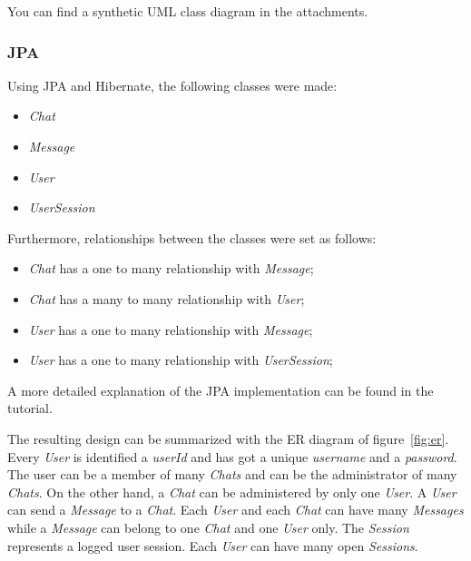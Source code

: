 \documentclass[10pt]{article}
\begin{document}
You can find a synthetic UML class diagram in the attachments.

\subsubsection{JPA}

Using JPA and Hibernate, the following classes were made:
\begin{itemize}
    \item \emph{Chat}
    \item \emph{Message}
    \item \emph{User}
    \item \emph{UserSession}
\end{itemize}

Furthermore, relationships between the classes were set as follows:
\begin{itemize}
    \item \emph{Chat} has a one to many relationship with \emph{Message};
    \item \emph{Chat} has a many to many relationship with \emph{User};
    \item \emph{User} has a one to many relationship with \emph{Message};
    \item \emph{User} has a one to many relationship with \emph{UserSession};
\end{itemize}

A more detailed explanation of the JPA implementation can be found in the tutorial.

The resulting design can be summarized with the ER diagram of figure~\ref{fig:er}.
Every \emph{User} is identified a \emph{userId} and has got a unique \emph{username} and a 
\emph{password}. The user can be a member of many \emph{Chats} and can 
be the administrator of many \emph{Chats}. On the other hand, a \emph{Chat} 
can be administered by only one \emph{User}. A \emph{User} can send a 
\emph{Message} to a \emph{Chat}. Each \emph{User} and each \emph{Chat} can 
have many \emph{Messages} while a \emph{Message} can belong to one \emph{Chat}
and one \emph{User} only. The \emph{Session} represents a logged user session.
Each \emph{User} can have many open \emph{Sessions}.
\end{document}
